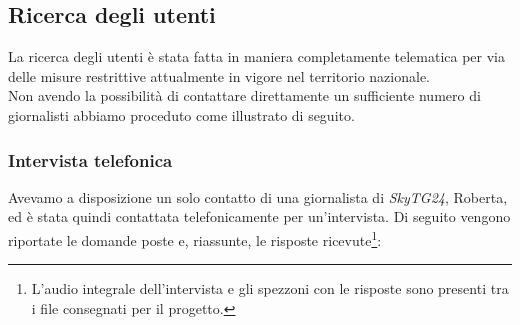 \subsection{Ricerca degli utenti}
La ricerca degli utenti è stata fatta in maniera completamente telematica per via delle misure restrittive attualmente in vigore nel territorio nazionale.\\
Non avendo la possibilità di contattare direttamente un sufficiente numero di giornalisti abbiamo proceduto come illustrato di seguito.

\subsubsection{Intervista telefonica}
Avevamo a disposizione un solo contatto di una giornalista di \textit{SkyTG24}, Roberta, ed è stata quindi contattata telefonicamente per un'intervista.
Di seguito vengono riportate le domande poste e, riassunte, le risposte ricevute\footnote{L'audio integrale dell'intervista e gli spezzoni con le risposte sono presenti tra i file consegnati per il progetto.}:
